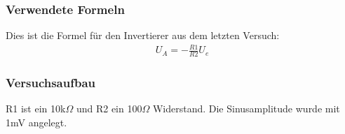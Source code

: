 \documentclass[12pt,a4paper]{article}
\begin{document}
\subsubsection{Verwendete Formeln}
Dies ist die Formel für den Invertierer aus dem letzten Versuch:
\begin{align}
U_A=-\frac{R1}{R2} U_e
\end{align}
\subsubsection{Versuchsaufbau}

R1 ist ein 10k$\Omega$ und R2 ein 100$\Omega$ Widerstand. Die Sinusamplitude wurde mit 1mV angelegt.
\end{document}
